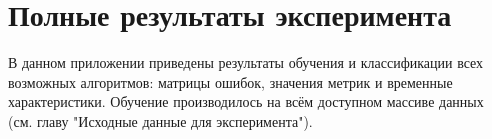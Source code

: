 
\chapter{Полные результаты эксперимента}

В данном приложении приведены результаты обучения и классификации всех возможных алгоритмов: матрицы ошибок, значения метрик и временные характеристики. Обучение производилось на всём доступном массиве данных (см. главу "Исходные данные для эксперимента").

\newcommand{\tableopts}{H}
\newcommand{\tableformat}{|l|c|c|c|r|}

 
\clearpage

\clearpage
